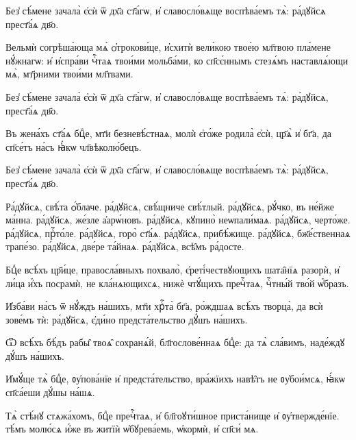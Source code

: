 \hKv Без̾ сѣ́мене зачала̀ є҆сѝ ѿ дх҃а ст҃а́гѡ, и҆  славосло́вѧще воспѣва́емъ тѧ̀: ра́дꙋйсѧ прест҃а́ѧ дв҃о.  
%

\hKv Вельмѝ согрѣша́юща мѧ̀ ѻ҆трокови́це, и҆схитѝ вели́кою  твое́ю мл҃твою пла́мене нꙋ́жнагѡ: и҆ и҆спра́ви чⷭ҇таѧ  твои́ми мольба́ми, ко сп҃сє́ннымъ стезѧ́мъ наставлѧ́ющи  мѧ̀, мт҃рними твои́ми мл҃твами.  
%

\hKv Без̾ сѣ́мене зачала̀ є҆сѝ ѿ дх҃а ст҃а́гѡ, и҆  славосло́вѧще воспѣва́емъ тѧ̀: ра́дꙋйсѧ, прест҃а́ѧ дв҃о. 
%

\hKv Въ жена́хъ ст҃а́ѧ бцⷣе, мт҃и безневѣ́стнаѧ, молѝ є҆го́же  родила̀ є҆сѝ, цр҃ѧ̀ и҆ бг҃а, да сп҃се́тъ на́съ ꙗ҆́кѡ  чл҃вѣколю́бецъ. 
%

\hKv Без̾ сѣ́мене зачала̀ є҆сѝ ѿ дх҃а ст҃а́гѡ, и҆  славосло́вѧще воспѣва́емъ тѧ̀: ра́дꙋйсѧ, прест҃а́ѧ дв҃о.   
%

\hKv Ра́дꙋйсѧ, свѣ́та ѻ҆́блаче. ра́дꙋйсѧ, свѣ́щниче свѣ́тлый.  ра́дꙋйсѧ, рꙋ́чко, въ не́йже ма́нна. ра́дꙋйсѧ, же́зле  а҆арѡ́новъ. ра́дꙋйсѧ, кꙋпино̀ неѡпали́маѧ. ра́дꙋйсѧ,  черто́же. ра́дꙋйсѧ, прⷭ҇то́ле. ра́дꙋйсѧ, горо̀ ст҃а́ѧ.  ра́дꙋйсѧ, прибѣ́жище. ра́дꙋйсѧ, бж҃е́ственнаѧ трапе́зо.  ра́дꙋйсѧ, две́ре та́йнаѧ. ра́дꙋйсѧ, всѣ̑мъ ра́досте. 
%

\hKv Бцⷣе всѣ́хъ цр҃и́це, правосла́вныхъ похвало̀,  є҆реті́чествꙋющихъ шата̑нїѧ разорѝ, и҆ ли́ца и҆́хъ  посрамѝ, не кла́нѧющихсѧ, нижѐ чтꙋ́щихъ пречⷭ҇таѧ,  чⷭ҇тны́й тво́й ѡ҆́бразъ. 
%

\hKv И҆зба́ви на́съ ѿ нꙋ́ждъ на́шихъ, мт҃и хрⷭ҇та̀ бг҃а,  ро́ждшаѧ всѣ́хъ творца̀, да всѝ зове́мъ тѝ: ра́дꙋйсѧ,  є҆ди́но предста́тельство дꙋ́шъ на́шихъ.  
%

\hKv Ѿ всѣ́хъ бѣ́дъ рабы̑ твоѧ̑ сохранѧ́й, бл҃гослове́ннаѧ  бцⷣе: да тѧ̀ сла́вимъ, наде́ждꙋ дꙋ́шъ на́шихъ. 
%

\hKv И҆мꙋ́ще тѧ̀ бцⷣе, ᲂу҆пова́нїе и҆ предста́тельство,  вра́жїихъ навѣ̑тъ не ᲂу҆бои́мсѧ, ꙗ҆́кѡ сп҃са́еши дꙋ́шы  на́шѧ. 
%

\hKv Тѧ̀ стѣ́нꙋ стѧжа́хомъ, бцⷣе пречⷭ҇таѧ, и҆ бл҃гоꙋти́шное  приста́нище и҆ ᲂу҆твержде́нїе. тѣ́мъ молю́сѧ и҆́же въ  житїѝ ѡ҆бꙋрева́емь, ѡ҆кормѝ, и҆ сп҃си́ мѧ. 
%

